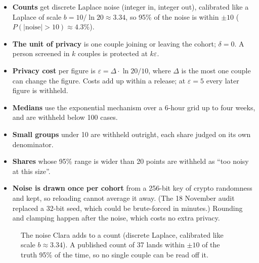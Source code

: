 \documentclass[10.5pt,a4paper]{article}
\begin{document}
\begin{itemize}
  \item \textbf{Counts} get discrete Laplace noise (integer in, integer out), calibrated like a Laplace of scale
        $b = 10/\ln 20 \approx 3.34$, so 95\% of the noise is within $\pm 10$ ($P(|\text{noise}| > 10) \approx 4.3\%$).
  \item \textbf{The unit of privacy} is one couple joining or leaving the cohort; $\delta = 0$. A person screened in
        $k$ couples is protected at $k\varepsilon$.
  \item \textbf{Privacy cost} per figure is $\varepsilon = \Delta \cdot \ln 20 / 10$, where $\Delta$ is the most one
        couple can change the figure. Costs add up within a release; at $\varepsilon = 5$ every later figure is
        withheld.
  \item \textbf{Medians} use the exponential mechanism over a 6-hour grid up to four weeks, and are withheld below 100
        cases.
  \item \textbf{Small groups} under 10 are withheld outright, each share judged on its own denominator.
  \item \textbf{Shares} whose 95\% range is wider than 20 points are withheld as ``too noisy at this size''.
  \item \textbf{Noise is drawn once per cohort} from a 256-bit key of crypto randomness and kept, so reloading cannot
        average it away. (The 18 November audit replaced a 32-bit seed, which could be brute-forced in minutes.) Rounding and clamping
        happen after the noise, which costs no extra privacy.
\end{itemize}

\begin{figure}[!htbp]
\centering
{}
\caption{The noise Clara adds to a count (discrete Laplace, calibrated like scale $b \approx 3.34$). A published count of 37 lands within $\pm 10$ of the truth 95\% of the time, so no single couple can be read off it.}
\end{figure}
\end{document}
